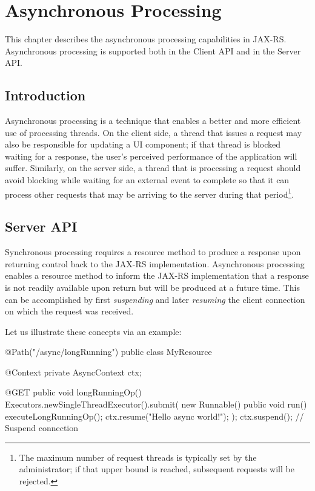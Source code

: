 \chapter{Asynchronous Processing}
\label{asynchronous_processing}

This chapter describes the asynchronous processing capabilities in JAX-RS. Asynchronous processing is supported both in the Client API and in the Server API.

\section{Introduction}
\label{introduction}

Asynchronous processing is a technique that enables a better and more efficient use of processing threads. On the client side, a thread that issues a request may also be responsible for updating a UI component; if that thread is blocked waiting for a response, the user's perceived performance of the application will suffer. Similarly, on the server side, a thread that is processing a request should avoid blocking while waiting for an external event to complete so that it can process other requests that may be arriving to the server during that period\footnote{The maximum number of request threads is typically set by the administrator; if that upper bound is reached, subsequent requests will be rejected.}.

\section{Server API}
\label{server_api}

Synchronous processing requires a resource method to produce a response upon returning control back to the JAX-RS implementation. Asynchronous processing enables a resource method to inform the JAX-RS implementation that a response is not readily available upon return but will be produced at a future time. This can be accomplished by first {\em suspending} and later {\em resuming} the client connection on which the request was received. 

Let us illustrate these concepts via an example:

\begin{listing}{1}
@Path("/async/longRunning")
public class MyResource {
    @Context
    private AsyncContext ctx;
    
    @GET
    public void longRunningOp() {
        Executors.newSingleThreadExecutor().submit(
            new Runnable() {
                public void run() {
                    executeLongRunningOp();
                    ctx.resume("Hello async world!");
        } });
        ctx.suspend();    // Suspend connection
    } 
}
\end{listing}

